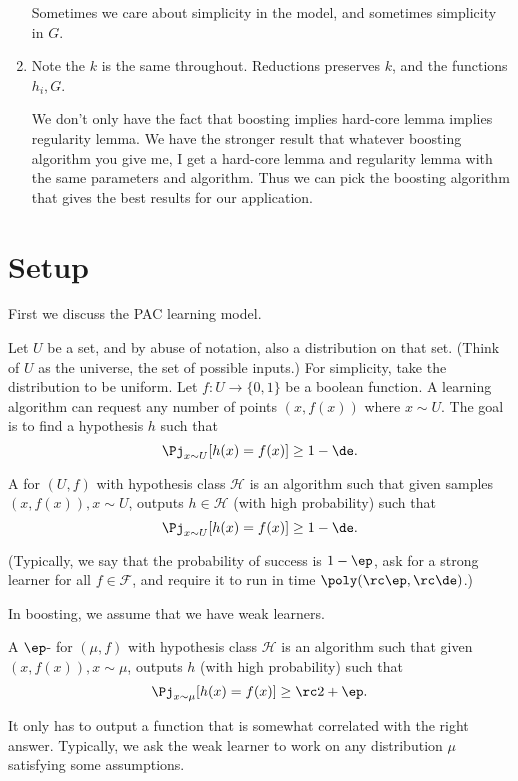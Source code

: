 \begin{enumerate}
Sometimes we care about simplicity in the model, and sometimes simplicity in $G$.
\item
Note the $k$ is the same throughout. Reductions preserves $k$, and the functions $h_i, G$. 

We don't only have the fact that boosting implies hard-core lemma implies regularity lemma. We have the stronger result that whatever boosting algorithm you give me, I get a hard-core lemma and regularity lemma with the same parameters and algorithm. %
Thus we can pick the boosting algorithm that gives the best results for our application.
\end{enumerate}
\section{Setup}
First we discuss the PAC learning model.

Let $U$ be a set, and by abuse of notation, also a distribution on that set. (Think of $U$ as the universe, the set of possible inputs.) For simplicity, take the distribution to be uniform.
Let $f:U\to \{0,1\}$ be a boolean function.
A learning algorithm can request any number of points $(x,f(x))$ where $x\sim U$. The goal is to find a hypothesis $h$ such that 
$$
\Pj_{x\sim U} [h(x)=f(x)]\ge 1-\de.
$$
\begin{thm}
A  for $(U,f)$ with hypothesis class $\mathcal H$ is an algorithm such that given samples $(x,f(x)), x\sim U$, outputs $h\in \mathcal H$ (with high probability) such that 
$$\Pj_{x\sim U}[h(x)=f(x)]\ge 1-\de.$$

(Typically, we say that the probability of success is $1-\ep$, ask for a strong learner for all $f\in \mathcal F$, and require it to run in time $\poly(\rc \ep, \rc \de)$.) 
\end{thm}

In boosting, we assume that we have weak learners.
\begin{thm}
A $\ep$- for $(\mu, f)$ with hypothesis class $\mathcal H$ is an algorithm such that given $(x,f(x)), x\sim \mu$, outputs $h$ (with high probability) such that
$$
\Pj_{x\sim \mu} [h(x)=f(x)] \ge \rc 2+\ep.
$$
\end{thm}
It only has to output a function that is somewhat correlated with the right answer.
Typically, we ask the weak learner to work on any distribution $\mu$ satisfying some assumptions.

